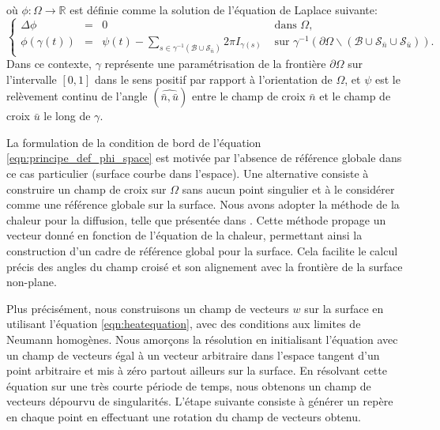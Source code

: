 où $\phi:\Omega\longrightarrow\mathbb{R}$ est définie comme la solution de l'équation de Laplace suivante:
\begin{equation}
\left\{
\begin{array}{lcll}
\Delta\phi &=& 0 &\mbox{ dans }\Omega,\\[0.5cm]
\phi(\gamma(t))&=&\psi(t)-\displaystyle\sum_{s\in\gamma^{-1}(\mathcal{B}\cup\mathcal{S}_{\bar{n}})}2\pi I_{\gamma(s)}& \mbox{ sur } \gamma^{-1}(\partial\Omega\backslash(\mathcal{B}\cup\mathcal{S}_{\bar{n}}\cup\mathcal{S}_{\bar{u}})).
\end{array}
\right.
\label{eqn:principe_def_phi_space}
\end{equation}
Dans ce contexte, $\gamma$ représente une paramétrisation de la frontière $\partial\Omega$ sur l'intervalle $[0, 1]$ dans le sens positif par rapport à l'orientation de $\Omega$, et $\psi$ est le relèvement continu de l'angle $(\widehat{\bar{n}, \bar{u}})$ entre le champ de croix $\bar{n}$ et le champ de croix $\bar{u}$ le long de $\gamma$.

La formulation de la condition de bord de l'équation \ref{eqn:principe_def_phi_space} est motivée par l'absence de référence globale dans ce cas particulier (surface courbe dans l'espace). Une alternative consiste à construire un champ de croix sur $\Omega$ sans aucun point singulier et à le considérer comme une référence globale sur la surface. Nous avons adopter la méthode de la chaleur pour la diffusion, telle que présentée dans \cite{sharp2019vector}. Cette méthode propage un vecteur donné en fonction de l'équation de la chaleur, permettant ainsi la construction d'un cadre de référence global pour la surface. Cela facilite le calcul précis des angles du champ croisé et son alignement avec la frontière de la surface non-plane.

Plus précisément, nous construisons un champ de vecteurs $w$ sur la surface en utilisant l'équation \eqref{eqn:heatequation}, avec des conditions aux limites de Neumann homogènes. Nous amorçons la résolution en initialisant l'équation avec un champ de vecteurs égal à un vecteur arbitraire dans l'espace tangent d'un point arbitraire et mis à zéro partout ailleurs sur la surface. En résolvant cette équation sur une très courte période de temps, nous obtenons un champ de vecteurs dépourvu de singularités. L'étape suivante consiste à générer un repère en chaque point en effectuant une rotation du champ de vecteurs obtenu.

